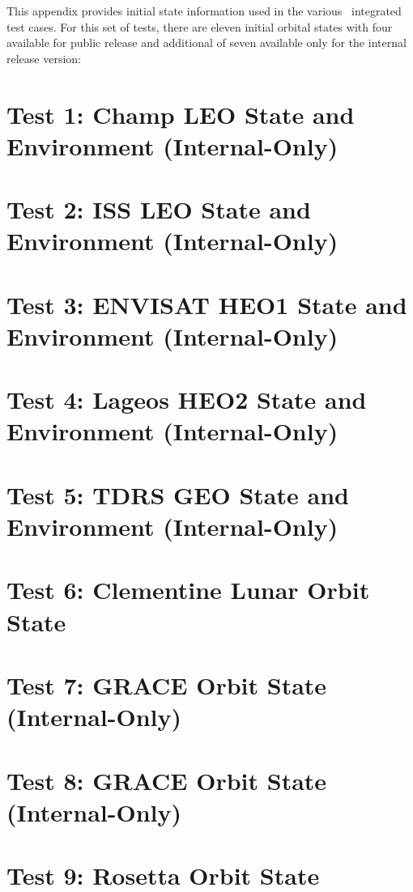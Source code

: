 This appendix provides initial state information used in the various \JEOD\ integrated
test cases. For this set of tests, there are eleven initial orbital states with four available
for public release and additional of seven available only for the internal release version:
\newpage
\section {Test 1: Champ LEO State and Environment (Internal-Only)}\label{tbl:champic}

\section {Test 2: ISS LEO State and Environment (Internal-Only)}\label{tbl:issic}

\section {Test 3: ENVISAT HEO1 State and Environment (Internal-Only)}\label{tbl:eviic}

\section {Test 4: Lageos HEO2 State and Environment (Internal-Only)}\label{tbl:lagic}

\section {Test 5: TDRS GEO State and Environment (Internal-Only)}\label{tbl:tdrsic}

\newpage
\section {Test 6: Clementine Lunar Orbit State}\label{tbl:clemic}


\newpage
\section {Test 7: GRACE Orbit State (Internal-Only)}\label{tbl:gracea}

\section {Test 8: GRACE Orbit State (Internal-Only)}\label{tbl:graceb}

\newpage
\section {Test 9: Rosetta Orbit State}\label{tbl:rosetta}



